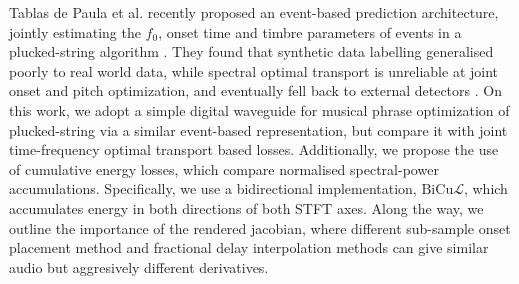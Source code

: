 \documentclass[conference]{IEEEtran}
\newcommand{\bicul}{\ensuremath{\mathrm{BiCu}\mathcal{L}}}
\begin{document}
Tablas de Paula et al. recently proposed an event-based prediction architecture, jointly estimating the $f_0$, onset time and timbre parameters of events in a plucked-string algorithm \cite{tablasdepaula2026karplus}. They found that synthetic data labelling generalised poorly to real world data, while spectral optimal transport is unreliable at joint onset and pitch optimization, and eventually fell back to external detectors \cite{tablasdepaula2026karplus}. On this work, we adopt a simple digital waveguide \cite{depaula2026waveguides} for musical phrase optimization of plucked-string via a similar event-based representation, but compare it with joint time-frequency optimal transport based losses. Additionally, we propose the use of cumulative energy losses, which compare normalised spectral-power accumulations. Specifically, we use a bidirectional implementation, \bicul{}, which accumulates energy in both directions of both STFT axes. Along the way, we outline the importance of the rendered jacobian, where different sub-sample onset placement method and fractional delay interpolation methods can give similar audio but aggresively different derivatives.
\end{document}

